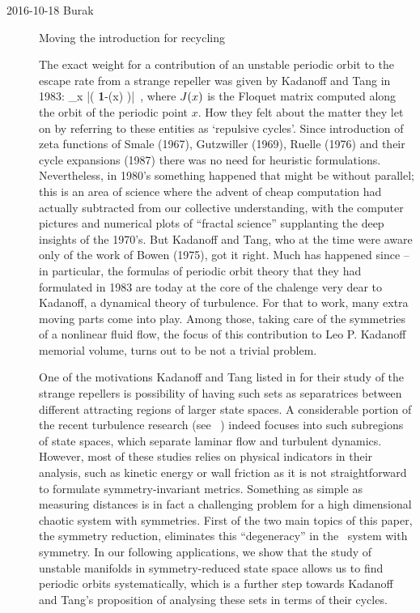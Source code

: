 \begin{description}
\item[2016-10-18 Burak] Moving the introduction for recycling

The {exact} weight for a contribution of an unstable periodic orbit to
the escape rate from a strange repeller was given by Kadanoff and
Tang in 1983:
\beq
\sum_{x }
{\left|\det \left( {\bf 1}-\jMps(x) \right)\right| }
\,,
\label{tr-L0a}
\eeq
where $J(x)$ is the Floquet matrix computed along the orbit of the
periodic point $x$. How they felt about the matter they let on by
referring to these entities as `repulsive cycles'. Since introduction of
zeta functions of Smale (1967), Gutzwiller
(1969), Ruelle (1976) and their
cycle expansions (1987) there was no need for heuristic
formulations. Nevertheless, in 1980's something happened that might be
without parallel; this is an area of science where the advent of cheap
computation had actually subtracted from our collective understanding,
with the computer pictures and numerical plots of ``fractal science''
supplanting the deep insights of the 1970's. But
Kadanoff and Tang, who at the time were  aware only of the work of Bowen
(1975), got it right. Much has happened since -- in particular,
the formulas of periodic orbit theory that they had formulated in 1983
are today at the core of the chalenge very dear to Kadanoff, a dynamical
theory of turbulence. For that to work, many
extra moving parts come into play. Among those, taking care of the
symmetries of a nonlinear fluid flow, the focus of this contribution to
Leo P. Kadanoff memorial volume, turns out to be not a trivial problem.

One of the motivations Kadanoff and Tang listed in 
	for their study of the strange repellers is possibility of having
	such sets as separatrices between different attracting regions of
	larger state spaces. A considerable portion of the recent
	turbulence research
	(see \eg\ )
	indeed focuses into such subregions of
	state spaces, which separate laminar flow and turbulent
	dynamics. 	
	However, most of these studies relies on physical
	indicators in their analysis, such as kinetic energy or wall
	friction as it is not straightforward to formulate
	symmetry-invariant metrics. Something as simple as measuring
	distances is in fact a challenging problem for a high
	dimensional chaotic system with symmetries.
	First of the two main topics of this paper, the symmetry
	reduction, eliminates this ``degeneracy'' in the \KS\ system
	with  symmetry. In our following applications, we show
	that the study of unstable manifolds in symmetry-reduced
	state space allows us to find periodic orbits systematically,
	which is a further step towards Kadanoff and Tang's
	proposition of analysing these sets in terms of their cycles.


\end{description}

